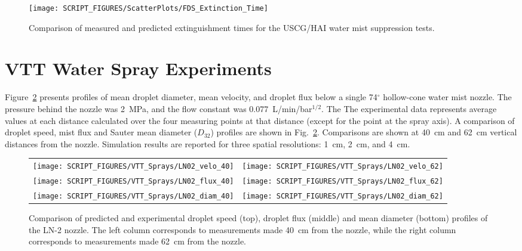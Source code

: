 \begin{figure}[h!]
\begin{center}
\texttt{[image: SCRIPT\_FIGURES/ScatterPlots/FDS\_Extinction\_Time]}
\caption[Extinguishment times for the USCG/HAI water mist suppression tests]{Comparison of measured and predicted extinguishment times for the USCG/HAI water mist suppression tests.}
\label{USCG_Scatter}
\end{center}
\end{figure}

\clearpage

\section{VTT Water Spray Experiments}

Figure~\ref{LN02} presents profiles of mean droplet diameter, mean velocity, and droplet flux below a single 74$^\circ$ hollow-cone water mist nozzle. The pressure behind the nozzle was 2~MPa, and the flow constant was 0.077~L/min/bar$^{1/2}$. The The experimental data represents average values at each distance calculated over the four measuring points at that distance (except for the point at the spray axis). A comparison of droplet speed, mist flux and Sauter mean diameter ($D_{32}$) profiles are shown in Fig.~\ref{LN02}. Comparisons are shown at 40~cm and 62~cm vertical distances from the nozzle. Simulation results are reported for three spatial resolutions: 1~cm, 2~cm, and 4~cm.

\begin{figure}
\begin{tabular*}{\textwidth}{l@{\extracolsep{\fill}}r}
\texttt{[image: SCRIPT\_FIGURES/VTT\_Sprays/LN02\_velo\_40]} &
\texttt{[image: SCRIPT\_FIGURES/VTT\_Sprays/LN02\_velo\_62]}  \\
\texttt{[image: SCRIPT\_FIGURES/VTT\_Sprays/LN02\_flux\_40]} &
\texttt{[image: SCRIPT\_FIGURES/VTT\_Sprays/LN02\_flux\_62]}  \\
\texttt{[image: SCRIPT\_FIGURES/VTT\_Sprays/LN02\_diam\_40]} &
\texttt{[image: SCRIPT\_FIGURES/VTT\_Sprays/LN02\_diam\_62]}  \\
\end{tabular*}
\caption[Droplet speed, flux, and mean diameter profiles of the LN-2 nozzle]{Comparison of predicted and experimental droplet speed (top), droplet flux (middle) and mean diameter (bottom) profiles of the LN-2 nozzle. The left column corresponds to measurements made 40~cm from the nozzle, while the right column corresponds to measurements made 62~cm from the nozzle.}
\label{LN02}
\end{figure}


